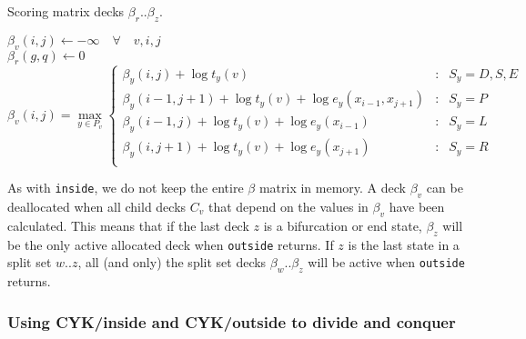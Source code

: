 \documentclass[11pt]{article}
\begin{document}
\begin{algorithm}
         {Scoring matrix decks $\beta_r..\beta_z$.}
\begin{algtab*}
 $\beta_v(i,j) \leftarrow -\infty \quad \forall \quad v,i,j$\\
 $\beta_r(g,q) \leftarrow 0$\\
       $\beta_v(i,j) = \max\limits_{y \in P_v} \left\{
              \begin{array}{rcl}
              \beta_y(i,j) + \log t_y(v) &:&  S_y = D,S,E \\
              \beta_y(i-1,j+1) + \log t_y(v) + \log e_y(x_{i-1}, x_{j+1}) &:& S_y = P\\
              \beta_y(i-1,j) + \log t_y(v) + \log e_y(x_{i-1}) &:& S_y = L\\
              \beta_y(i,j+1) + \log t_y(v) + \log e_y(x_{j+1})  &:& S_y = R \\
              \end{array} \right.$
\end{algtab*}
\end{algorithm}

As with \texttt{inside}, we do not keep the entire $\beta$ matrix in
memory. A deck $\beta_v$ can be deallocated when all child decks $C_v$
that depend on the values in $\beta_v$ have been calculated. This
means that if the last deck $z$ is a bifurcation or end state,
$\beta_z$ will be the only active allocated deck when \texttt{outside}
returns. If $z$ is the last state in a split set $w..z$, all (and
only) the split set decks $\beta_w..\beta_z$ will be active when
\texttt{outside} returns.

\subsubsection{Using CYK/inside and CYK/outside to divide and conquer}
\end{document}

